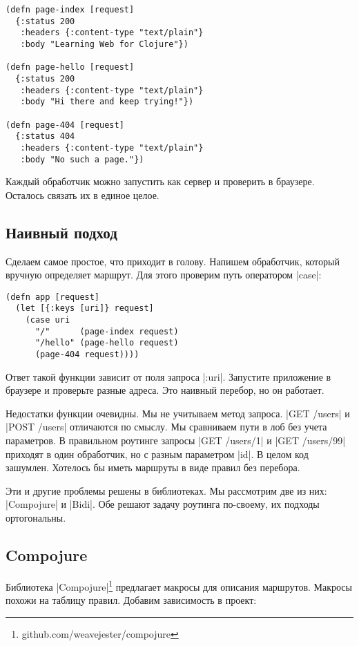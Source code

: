 \begin{verbatim}
(defn page-index [request]
  {:status 200
   :headers {:content-type "text/plain"}
   :body "Learning Web for Clojure"})

(defn page-hello [request]
  {:status 200
   :headers {:content-type "text/plain"}
   :body "Hi there and keep trying!"})

(defn page-404 [request]
  {:status 404
   :headers {:content-type "text/plain"}
   :body "No such a page."})
\end{verbatim}

Каждый обработчик можно запустить как сервер и проверить в браузере. Осталось
связать их в единое целое.

\subsection{Наивный подход}

Сделаем самое простое, что приходит в голову. Напишем обработчик, который
вручную определяет маршрут. Для этого проверим путь оператором \spverb|case|:

\begin{verbatim}
(defn app [request]
  (let [{:keys [uri]} request]
    (case uri
      "/"      (page-index request)
      "/hello" (page-hello request)
      (page-404 request))))
\end{verbatim}

Ответ такой функции зависит от поля запроса \spverb|:uri|. Запустите приложение
в браузере и проверьте разные адреса. Это наивный перебор, но он работает.

Недостатки функции очевидны. Мы не учитываем метод запроса. \spverb|GET /users| и
\spverb|POST /users| отличаются по смыслу. Мы сравниваем пути в лоб без
учета параметров. В правильном роутинге запросы \spverb|GET /users/1|
и \spverb|GET /users/99| приходят в один обработчик, но с разным параметром \spverb|id|.
В целом код зашумлен. Хотелось бы иметь маршруты в виде правил без перебора.

Эти и другие проблемы решены в библиотеках. Мы рассмотрим две
из них: \spverb|Compojure| и \spverb|Bidi|. Обе решают задачу роутинга по-своему, их
подходы ортогональны.

\subsection{Compojure}

Библиотека \spverb|Compojure|\footnote{github.com/weavejester/compojure}
предлагает макросы для описания маршрутов. Макросы похожи на таблицу правил.
Добавим зависимость в проект:


